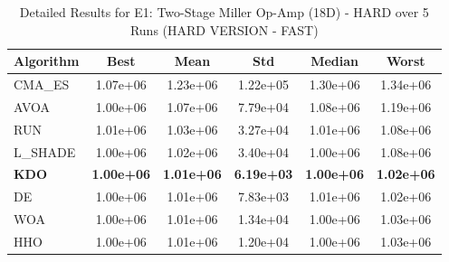 \begin{table}[htbp]
\centering
\caption{Detailed Results for E1: Two-Stage Miller Op-Amp (18D) - HARD over 5 Runs (HARD VERSION - FAST)}
\label{tab:P1_detailed}
\small
\begin{tabular}{lccccc}
\toprule
\textbf{Algorithm} & \textbf{Best} & \textbf{Mean} & \textbf{Std} & \textbf{Median} & \textbf{Worst} \\
\midrule
CMA_ES & 1.07e+06 & 1.23e+06 & 1.22e+05 & 1.30e+06 & 1.34e+06 \\
AVOA & 1.00e+06 & 1.07e+06 & 7.79e+04 & 1.08e+06 & 1.19e+06 \\
RUN & 1.01e+06 & 1.03e+06 & 3.27e+04 & 1.01e+06 & 1.08e+06 \\
L_SHADE & 1.00e+06 & 1.02e+06 & 3.40e+04 & 1.00e+06 & 1.08e+06 \\
\textbf{KDO} & \textbf{1.00e+06} & \textbf{1.01e+06} & \textbf{6.19e+03} & \textbf{1.00e+06} & \textbf{1.02e+06} \\
DE & 1.00e+06 & 1.01e+06 & 7.83e+03 & 1.01e+06 & 1.02e+06 \\
WOA & 1.00e+06 & 1.01e+06 & 1.34e+04 & 1.00e+06 & 1.03e+06 \\
HHO & 1.00e+06 & 1.01e+06 & 1.20e+04 & 1.00e+06 & 1.03e+06 \\
\bottomrule
\end{tabular}
\end{table}
